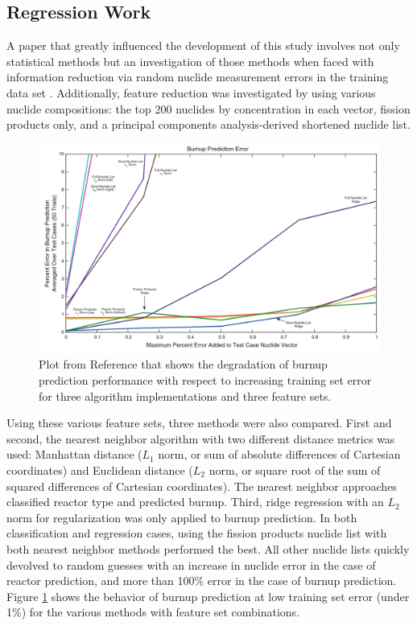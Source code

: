 \subsection{Regression Work}

A paper that greatly influenced the development of this study involves not only
statistical methods but an investigation of those methods when faced with
information reduction via random nuclide measurement errors in the training
data set \cite{dayman_feasibility_2013}.  Additionally, feature reduction was
investigated by using various nuclide compositions: the top 200 nuclides by
concentration in each vector, fission products only, and a principal components
analysis-derived shortened nuclide list.  

\begin{figure}[!htb]
  \centering
  \includegraphics[width=\linewidth]{./chapters/litrev/dayman.png}
  \caption[Burnup performance with respect to training set error]
          {Plot from Reference \cite{dayman_feasibility_2013} that shows the 
           degradation of burnup prediction performance with respect to 
           increasing training set error for three algorithm implementations 
           and three feature sets.}
  \label{fig:dayman}
\end{figure}

Using these various feature sets, three methods were also compared. First and
second, the nearest neighbor algorithm with two different distance metrics was
used: Manhattan distance ($L_1$ norm, or sum of absolute differences of
Cartesian coordinates) and Euclidean distance ($L_2$ norm, or square root of
the sum of squared differences of Cartesian coordinates).  The nearest neighbor
approaches classified reactor type and predicted burnup.  Third, ridge
regression with an $L_2$ norm for regularization was only applied to burnup
prediction.  In both classification and regression cases, using the fission
products nuclide list with both nearest neighbor methods performed the best.
All other nuclide lists quickly devolved to random guesses with an increase in
nuclide error in the case of reactor prediction, and more than 100\% error in
the case of burnup prediction. Figure \ref{fig:dayman} shows the behavior of
burnup prediction at low training set error (under 1\%) for the various methods
with feature set combinations. 

